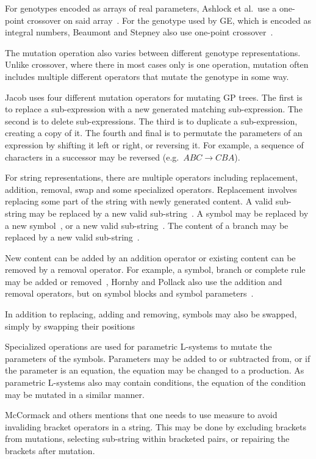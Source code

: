 For genotypes encoded as arrays of real parameters, Ashlock et al.\ use a one-point crossover on said array~\cite{2006Ashlock}.
For the genotype used by \gls{GE}, which is encoded as integral numbers, Beaumont and Stepney also use one-point crossover~\cite{2009Beaumont}.

The mutation operation also varies between different genotype representations.
Unlike crossover, where there in most cases only is one operation, mutation often includes multiple different operators that mutate the genotype in some way.

Jacob uses four different mutation operators for mutating \gls{GP} trees.
The first is to replace a sub-expression with a new generated matching sub-expression.
The second is to delete sub-expressions.
The third is to duplicate a sub-expression, creating a copy of it.
The fourth and final is to permutate the parameters of an expression by shifting it left or right, or reversing it.
For example, a sequence of characters in a successor may be reversed (e.g.\ $ABC \rightarrow CBA$).~\cite{1994Jacob, 1995Jacob}

For string representations, there are multiple operators including replacement, addition, removal, swap and some specialized operators.
Replacement involves replacing some part of the string with newly generated content.
A valid sub-string may be replaced by a new valid sub-string~\cite{1998Mock, 2009Corchado}.
A symbol may be replaced by a new symbol~\cite{2001Hornby, 2002Ebner, 2003Ebner, 2009Corchado, 2013Ding}, or a new valid sub-string~\cite{1998Ochoa}.
The content of a branch may be replaced by a new valid sub-string~\cite{1998Ochoa}.

New content can be added by an addition operator or existing content can be removed by a removal operator.
For example, a symbol, branch or complete rule may be added or removed~\cite{2002Ebner, 2003Ebner},
Hornby and Pollack also use the addition and removal operators, but on symbol blocks and symbol parameters~\cite{2001Hornby}.

In addition to replacing, adding and removing, symbols may also be swapped, simply by swapping their positions~\cite{2002Ebner, 2003Ebner}

Specialized operations are used for parametric \glspl{L-system} to mutate the parameters of the symbols.
Parameters may be added to or subtracted from, or if the parameter is an equation, the equation may be changed to a production.
As parametric \glspl{L-system} also may contain conditions, the equation of the condition may be mutated in a similar manner.~\cite{2001Hornby}

McCormack and others mentions that one needs to use measure to avoid invaliding bracket operators in a string.
This may be done by excluding brackets from mutations, selecting sub-string within bracketed pairs, or repairing the brackets after mutation.~\cite{2004McCormack}
